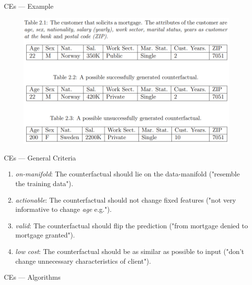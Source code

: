 \documentclass[aspectratio=169]{beamer}
\begin{document}
    \begin{frame}[fragile]{CEs — Example}
        \begin{figure}
            \centering
            \includegraphics[scale = 0.39]{figures/counterfact_example.png}
            \label{fig:counterfactualExample}
        \end{figure}
    \end{frame}

    \begin{frame}{CEs — General Criteria}
        \begin{enumerate}
            \item \textit{on-manifold}: The counterfactual should lie on the data-manifold ("resemble the training data").
            \item \textit{actionable}: The counterfactual should not change fixed features ("not very informative to change \textit{age} e.g.").
            \item \textit{valid}: The counterfactual should flip the prediction ("from mortgage denied to mortgage granted").
            \item \textit{low cost}: The counterfactual should be as similar as possible to input ("don't change unnecessary characteristics of client").
        \end{enumerate}
    \end{frame} 

    \begin{frame}[fragile]{CEs — Algorithms}
     
    \end{frame}
\end{document}
